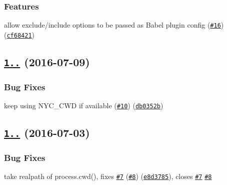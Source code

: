 \subsubsection*{Features}


\begin{DoxyItemize}
\item allow exclude/include options to be passed as Babel plugin config (\href{https://github.com/istanbuljs/babel-plugin-istanbul/issues/16}{\tt \#16}) (\href{https://github.com/istanbuljs/babel-plugin-istanbul/commit/cf68421}{\tt cf68421})
\end{DoxyItemize}

\label{_1.0.3}%
 \subsection*{\href{https://github.com/istanbuljs/babel-plugin-istanbul/compare/v1.0.2...v1.0.3}{\tt 1..} (2016-\/07-\/09)}

\subsubsection*{Bug Fixes}


\begin{DoxyItemize}
\item keep using N\+Y\+C\+\_\+\+C\+WD if available (\href{https://github.com/istanbuljs/babel-plugin-istanbul/issues/10}{\tt \#10}) (\href{https://github.com/istanbuljs/babel-plugin-istanbul/commit/db0352b}{\tt db0352b})
\end{DoxyItemize}

\label{_1.0.2}%
 \subsection*{\href{https://github.com/istanbuljs/babel-plugin-istanbul/compare/v1.0.1...v1.0.2}{\tt 1..} (2016-\/07-\/03)}

\subsubsection*{Bug Fixes}


\begin{DoxyItemize}
\item take realpath of process.\+cwd(), fixes \href{https://github.com/istanbuljs/babel-plugin-istanbul/issues/7}{\tt \#7} (\href{https://github.com/istanbuljs/babel-plugin-istanbul/issues/8}{\tt \#8}) (\href{https://github.com/istanbuljs/babel-plugin-istanbul/commit/e8d3785}{\tt e8d3785}), closes \href{https://github.com/istanbuljs/babel-plugin-istanbul/issues/7}{\tt \#7} \href{https://github.com/istanbuljs/babel-plugin-istanbul/issues/8}{\tt \#8}
\end{DoxyItemize}

